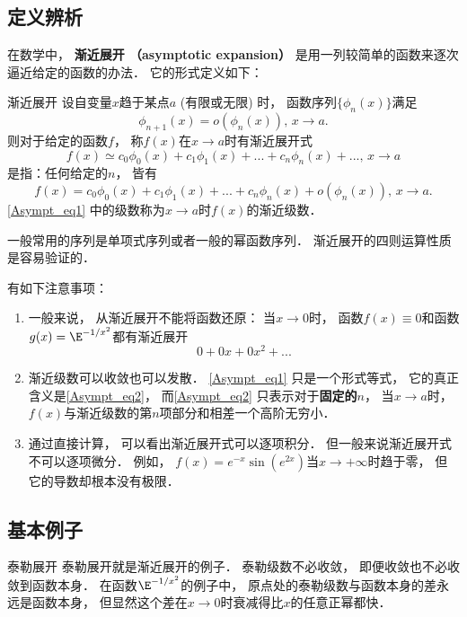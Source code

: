 
\subsection{定义辨析}
在数学中， \textbf{渐近展开 （asymptotic expansion）} 是用一列较简单的函数来逐次逼近给定的函数的办法． 它的形式定义如下：

\begin{definition}{渐近展开}
设自变量$x$趋于某点$a$ (有限或无限) 时， 函数序列$\{\phi_{n}(x)\}$满足
$$
\phi_{n+1}(x)=o(\phi_n(x)),\,x\to a.
$$
则对于给定的函数$f$， 称$f(x)$在$x\to a$时有渐近展开式
\begin{equation}\label{Asympt_eq1}
f(x)\simeq c_0\phi_0(x)+c_1\phi_1(x)+...+c_n\phi_n(x)+...,\,x\to a
\end{equation}
是指：任何给定的$n$， 皆有
\begin{equation}\label{Asympt_eq2}
f(x)=c_0\phi_0(x)+c_1\phi_1(x)+...+c_n\phi_n(x)+o(\phi_n(x)),\,x\to a.
\end{equation}
\autoref{Asympt_eq1} 中的级数称为$x\to a$时$f(x)$的渐近级数．
\end{definition}

一般常用的序列是单项式序列或者一般的幂函数序列． 渐近展开的四则运算性质是容易验证的．

有如下注意事项：
\begin{enumerate}
\item 一般来说， 从渐近展开不能将函数还原： 当$x\to0$时， 函数$f(x)\equiv 0$和函数$g(x)=\E^{-1/x^2}$都有渐近展开
$$
0+0x+0x^2+...
$$

\item 渐近级数可以收敛也可以发散． \autoref{Asympt_eq1} 只是一个形式等式， 它的真正含义是\autoref{Asympt_eq2}，  而\autoref{Asympt_eq2} 只表示对于\textbf{固定的$n$}， 当$x\to a$时， $f(x)$与渐近级数的第$n$项部分和相差一个高阶无穷小． 

\item 通过直接计算， 可以看出渐近展开式可以逐项积分． 但一般来说渐近展开式不可以逐项微分． 例如， $f(x)=e^{-x}\sin(e^{2x})$当$x\to+\infty$时趋于零， 但它的导数却根本没有极限．
\end{enumerate}

\subsection{基本例子}
\begin{example}{泰勒展开}
泰勒展开就是渐近展开的例子． 泰勒级数不必收敛， 即便收敛也不必收敛到函数本身． 在函数$\E^{-1/x^2}$的例子中， 原点处的泰勒级数与函数本身的差永远是函数本身， 但显然这个差在$x\to0$时衰减得比$x$的任意正幂都快．
\end{example}

